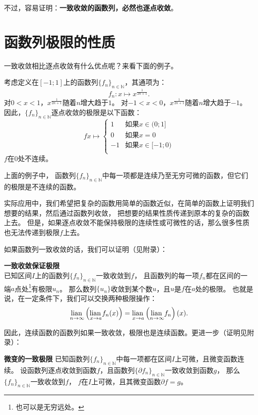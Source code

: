 \documentclass[12pt,UTF8,fontset=none]{ctexbook}
\begin{document}
不过，容易证明：\textbf{一致收敛的函数列，必然也逐点收敛}。

\section{函数列极限的性质}

一致收敛相比逐点收敛有什么优点呢？来看下面的例子。

\begin{ex}
    考虑定义在$[-1;1]$上的函数列$\{f_n\}_{n\in\mathbb{N}}$，其通项为：
    $$ f_n: x \mapsto x^{\frac{1}{2n+1}}. $$
    对$0<x<1$，$x^{\frac{1}{2n+1}}$随着$n$增大趋于$1$。
    对$-1<x<0$，$x^{\frac{1}{2n+1}}$随着$n$增大趋于$-1$。
    因此，$\{f_n\}_{n\in\mathbb{N}}$逐点收敛的极限是以下函数：
    $$
    f x\mapsto \left\{
        \begin{array}{ll}
            1 & \mbox{如果} x \in (0; 1] \\
            0 & \mbox{如果} x = 0 \\
            -1 & \mbox{如果} x \in [-1; 0) \\
        \end{array}
    \right.
    $$
    $f$在$0$处不连续。
\end{ex}
上面的例子中，
函数列$\{f_n\}_{n\in\mathbb{N}}$中每一项都是连续乃至无穷可微的函数，但它们的极限是不连续的函数。

实际应用中，我们希望把复杂的函数用简单的函数近似，在简单的函数上证明我们想要的结果，然后通过函数列收敛，
把想要的结果性质传递到原本的复杂的函数上去。
但是，如果逐点收敛不能保持极限的连续性或可微性的话，那么很多性质也无法传递到极限$f$上去。

如果函数列一致收敛的话，我们可以证明（见附录）：
\begin{tm}\textbf{一致收敛保证极限}\label{tm:2-1-10}\\
    已知区间$I$上的函数列$\{f_n\}_{n\in\mathbb{N}}$一致收敛到$f$，
    且函数列的每一项$f_n$都在区间的一端$a$点处\footnote{也可以是无穷远处。}有极限$u_n$。
    那么数列$\{u_n\}$收敛到某个数$u$，且$u$是$f$在$a$处的极限。
    也就是说，在一定条件下，我们可以交换两种极限操作：
    $$ \underset{n\to \infty}{\operatorname{lian}\,} \left( \underset{x\to a}{\operatorname{lian}\,} f_n(x) \right) = \underset{x\to a}{\operatorname{lian}\,} \left(\underset{n\to \infty}{\operatorname{lian}\,} f_n \right) (x). $$
\end{tm}

因此，连续函数的函数列如果一致收敛，极限也是连续函数。更进一步（证明见附录）：

\begin{tm}{\textbf{微变的一致极限}}\label{tm:2-1-20}
    已知函数列$\{f_n\}_{n\in\mathbb{N}}$中每一项都在区间$I$上可微，且微变函数连续。
    设函数列逐点收敛到函数$f$，且函数列$\{\partial f_n\}_{n\in\mathbb{N}}$一致收敛到函数$g$，
    那么$\{f_n\}_{n\in\mathbb{N}}$一致收敛到$f$，
    $f$在$I$上可微，且其微变函数$\partial f = g$。
\end{tm}
\end{document}
